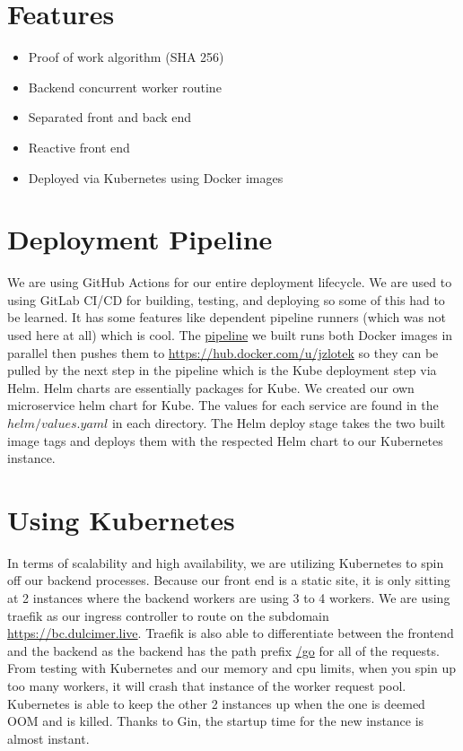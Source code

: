 \documentclass[12pt]{article}
\begin{document}
\maketitle

\section{Features}

\begin{itemize}
	\item Proof of work algorithm (SHA 256)
	\item Backend concurrent worker routine
	\item Separated front and back end
	\item Reactive front end
	\item Deployed via Kubernetes using Docker images
\end{itemize}



\section{Deployment Pipeline}

We are using GitHub Actions for our entire deployment lifecycle.
We are used to using GitLab CI/CD for building, testing, and deploying so some of this had to be learned.
It has some features like dependent pipeline runners (which was not used here at all) which is cool.
The \href{https://github.com/jzlotek/bc/blob/main/.github/workflows/docker-image.yml}{pipeline} we built runs both Docker images in parallel then pushes them to \url{https://hub.docker.com/u/jzlotek} so they can be pulled by the next step in the pipeline which is the Kube deployment step via Helm.
Helm charts are essentially packages for Kube.
We created our own microservice helm chart for Kube.
The values for each service are found in the $helm/values.yaml$ in each directory.
The Helm deploy stage takes the two built image tags and deploys them with the respected Helm chart to our Kubernetes instance.

\section{Using Kubernetes}

In terms of scalability and high availability, we are utilizing Kubernetes to spin off our backend processes.
Because our front end is a static site, it is only sitting at 2 instances where the backend workers are using 3 to 4 workers.
We are using traefik as our ingress controller to route on the subdomain \url{https://bc.dulcimer.live}.
Traefik is also able to differentiate between the frontend and the backend as the backend has the path prefix \url{/go} for all of the requests. From testing with Kubernetes and our memory and cpu limits, when you spin up too many workers, it will crash that instance of the worker request pool.
Kubernetes is able to keep the other 2 instances up when the one is deemed OOM and is killed.
Thanks to Gin, the startup time for the new instance is almost instant.
\end{document}
